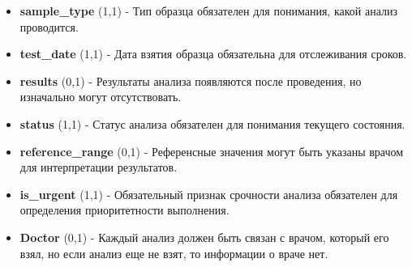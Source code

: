 \documentclass[a4paper, 14pt]{extarticle}
\begin{document}
\begin{itemize}
\begin{itemize}
\begin{itemize}
            \item \textbf{sample\_type} (1,1) - Тип образца обязателен для понимания, какой анализ проводится.
            \item \textbf{test\_date} (1,1) - Дата взятия образца обязательна для отслеживания сроков.
            \item \textbf{results} (0,1) - Результаты анализа появляются после проведения, но изначально могут отсутствовать.
            \item \textbf{status} (1,1) - Статус анализа обязателен для понимания текущего состояния.
            \item \textbf{reference\_range} (0,1) - Референсные значения могут быть указаны врачом для интерпретации результатов.
            \item \textbf{is\_urgent} (1,1) - Обязательный признак срочности анализа обязателен для определения приоритетности выполнения.
            \item \textbf{Doctor} (0,1) - Каждый анализ должен быть связан с врачом, который его взял, но если анализ еще не взят, то информации о враче нет.
        \end{itemize}
    \end{itemize}
\end{itemize}
\end{document}
